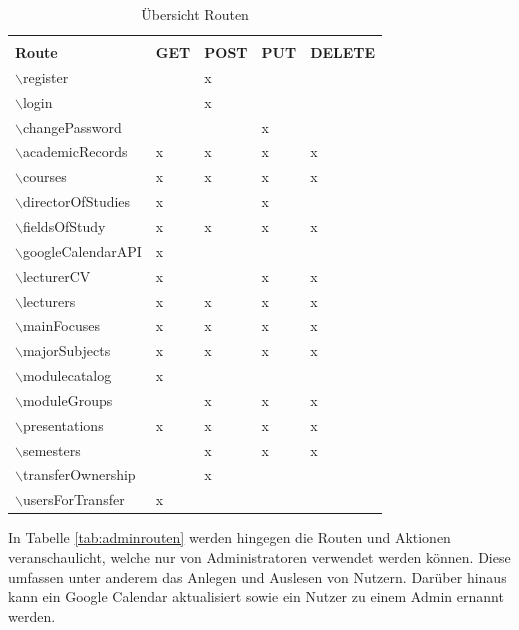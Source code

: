 \begin{table}[h]
	\centering
	\renewcommand*{\arraystretch}{1.25}
	\begin{tabular}{|l|P{2cm}|P{2cm}|P{2cm}|P{2cm}|}
		\hline &&\\[-0.6em]
		\textbf{Route} & \textbf{GET} & \textbf{POST} & \textbf{PUT} & \textbf{DELETE} \\ \hline
		$\backslash$register & & x & & \\ \hline
		$\backslash$login & & x & & \\ \hline
		$\backslash$changePassword & & & x & \\ \hline
		$\backslash$academicRecords & x & x & x & x \\ \hline
		$\backslash$courses & x & x & x & x \\ \hline
		$\backslash$directorOfStudies & x & & x & \\ \hline
		$\backslash$fieldsOfStudy & x & x & x & x \\ \hline
		$\backslash$googleCalendarAPI & x & & & \\ \hline
		$\backslash$lecturerCV & x & & x & x \\ \hline
		$\backslash$lecturers & x & x & x & x \\ \hline
		$\backslash$mainFocuses & x & x & x & x \\ \hline
		$\backslash$majorSubjects & x & x & x & x \\ \hline
		$\backslash$modulecatalog & x & & & \\ \hline
		$\backslash$moduleGroups & & x & x & x \\ \hline
		$\backslash$presentations & x & x & x & x \\ \hline
		$\backslash$semesters & & x & x & x \\ \hline
		$\backslash$transferOwnership & & x & & \\ \hline
		$\backslash$usersForTransfer & x & & & \\ \hline
	\end{tabular}
	\captionsetup{format=hang}
	\caption{\label{tab:routen}Übersicht Routen \\}
\end{table}

In Tabelle \vref{tab:adminrouten} werden hingegen die Routen und Aktionen veranschaulicht, welche nur von Administratoren verwendet werden können.
Diese umfassen unter anderem das Anlegen und Auslesen von Nutzern.
Darüber hinaus kann ein Google Calendar aktualisiert sowie ein Nutzer zu einem Admin ernannt werden. 

